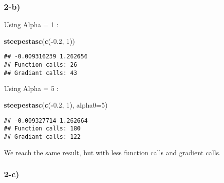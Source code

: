 \documentclass[
]{article}
\newenvironment{Shaded}{\begin{snugshade}}{\end{snugshade}}
\newcommand{\AttributeTok}[1]{\textcolor[rgb]{0.13,0.29,0.53}{#1}}
\newcommand{\DecValTok}[1]{\textcolor[rgb]{0.00,0.00,0.81}{#1}}
\newcommand{\FloatTok}[1]{\textcolor[rgb]{0.00,0.00,0.81}{#1}}
\newcommand{\FunctionTok}[1]{\textcolor[rgb]{0.13,0.29,0.53}{\textbf{#1}}}
\newcommand{\NormalTok}[1]{#1}
\newcommand{\SpecialCharTok}[1]{\textcolor[rgb]{0.81,0.36,0.00}{\textbf{#1}}}
\begin{document}
\hypertarget{b-3}{%
\subsubsection{2-b)}\label{b-3}}

Using Alpha = 1 :

\begin{Shaded}
\begin{Highlighting}[]
\FunctionTok{steepestasc}\NormalTok{(}\FunctionTok{c}\NormalTok{(}\SpecialCharTok{{-}}\FloatTok{0.2}\NormalTok{, }\DecValTok{1}\NormalTok{))}
\end{Highlighting}
\end{Shaded}

\begin{verbatim}
## -0.009316239 1.262656 
## Function calls: 26 
## Gradiant calls: 43
\end{verbatim}

Using Alpha = 5 :

\begin{Shaded}
\begin{Highlighting}[]
\FunctionTok{steepestasc}\NormalTok{(}\FunctionTok{c}\NormalTok{(}\SpecialCharTok{{-}}\FloatTok{0.2}\NormalTok{, }\DecValTok{1}\NormalTok{), }\AttributeTok{alpha0=}\DecValTok{5}\NormalTok{)}
\end{Highlighting}
\end{Shaded}

\begin{verbatim}
## -0.009327714 1.262664 
## Function calls: 180 
## Gradiant calls: 122
\end{verbatim}

We reach the same result, but with less function calls and gradient
calls.

\hypertarget{c-3}{%
\subsubsection{2-c)}\label{c-3}}
\end{document}

